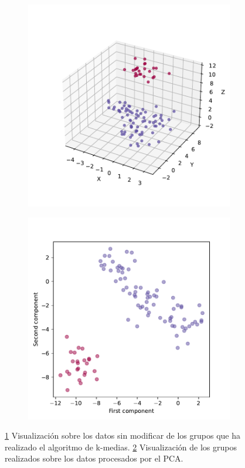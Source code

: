 \begin{figure}[h]
  \centering
  \begin{subfigure}{0.45\textwidth}
    \centering
    \includegraphics[width=\textwidth]{figures/kmeans-3d.pdf}
    \caption{}
    \label{fig:kmeans-3d}
  \end{subfigure}
  \begin{subfigure}{0.45\textwidth}
    \centering
    \includegraphics[width=\textwidth]{figures/kmeans-pca.pdf}
    \caption{}
    \label{fig:kmeans-pca}
  \end{subfigure}
  \caption[Prueba del algoritmo de k-medias.]{\ref{fig:kmeans-3d} Visualización sobre los datos sin modificar de los grupos que ha realizado el algoritmo de k-medias. \ref{fig:kmeans-pca} Visualización de los grupos realizados sobre los datos procesados por el PCA.}
  \label{fig:kmeans}
\end{figure}
